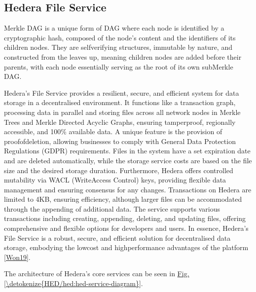 \documentclass[letterpaper,10pt,english]{jupyterBook}
\begin{document}
\subsection{Hedera File Service}
\label{\detokenize{HED/hed:hedera-file-service}}
\begin{sphinxShadowBox}

\sphinxAtStartPar
Merkle DAG is a unique form of DAG where each node is identified by a cryptographic hash, composed of the node’s content and the identifiers of its children nodes. They are self\sphinxhyphen{}verifying structures, immutable by nature, and constructed from the leaves up, meaning children nodes are added before their parents, with each node essentially serving as the root of its own sub\sphinxhyphen{}Merkle DAG.
\end{sphinxShadowBox}

\sphinxAtStartPar
Hedera’s File Service provides a resilient, secure, and efficient system for data storage in a decentralised environment. It functions like a transaction graph, processing data in parallel and storing files across all network nodes in Merkle Trees and Merkle Directed Acyclic Graphs, ensuring tamper\sphinxhyphen{}proof, regionally accessible, and 100\% available data. A unique feature is the provision of proof\sphinxhyphen{}of\sphinxhyphen{}deletion, allowing businesses to comply with General Data Protection Regulations (GDPR) requirements. Files in the system have a set expiration date and are deleted automatically, while the storage service costs are based on the file size and the desired storage duration. Furthermore, Hedera offers controlled mutability via WACL (WriteAccess Control) keys, providing flexible data management and ensuring consensus for any changes. Transactions on Hedera are limited to 4KB, ensuring efficiency, although larger files can be accommodated through the appending of additional data. The service supports various transactions including creating, appending, deleting, and updating files, offering comprehensive and flexible options for developers and users. In essence, Hedera’s File Service is a robust, secure, and efficient solution for decentralised data storage, embodying the low\sphinxhyphen{}cost and high\sphinxhyphen{}performance advantages of the platform {[}\hyperlink{cite.HED/hed:id127}{Won19}{]}.

\sphinxAtStartPar
The architecture of Hedera’s core services can be seen in \hyperref[\detokenize{HED/hed:hed-service-diagram}]{Fig.\@ \ref{\detokenize{HED/hed:hed-service-diagram}}}.
\end{document}

